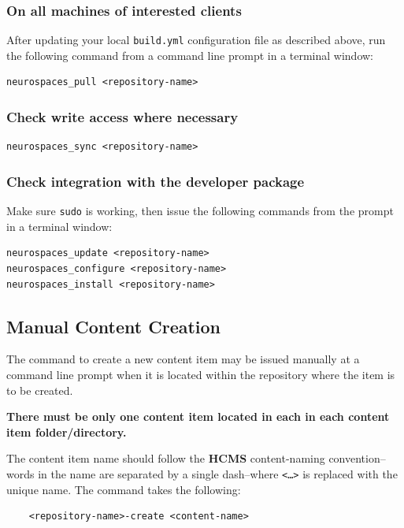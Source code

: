 \documentclass[12pt]{article}
\begin{document}
\subsubsection*{On all machines of interested clients}
After updating your local {\tt \small build.yml} configuration file as described above, run the following command from a command line prompt in a terminal window:
\begin{verbatim}
neurospaces_pull <repository-name>
\end{verbatim}

\subsubsection*{Check write access where necessary}

\begin{verbatim}
neurospaces_sync <repository-name>
\end{verbatim}

\subsubsection*{Check integration with the developer package}

Make sure {\tt \small sudo} is working, then issue the following commands from the prompt in a terminal window:

\begin{verbatim}
neurospaces_update <repository-name>
neurospaces_configure <repository-name>
neurospaces_install <repository-name>
\end{verbatim}

\subsection*{Manual Content Creation}

The command to create a new content item may be issued manually at a command line prompt when it is located within the repository where the item is to be created.

{\bf There must be only one content item located in each in each content item folder/directory.}

The content item name should follow the {\bf \small HCMS} content-naming convention--words in the name are separated by a single dash--where {\tt <\dots>} is replaced with the unique name. The command takes the following:
\begin{verbatim}
	<repository-name>-create <content-name>
\end{verbatim}
\end{document}
